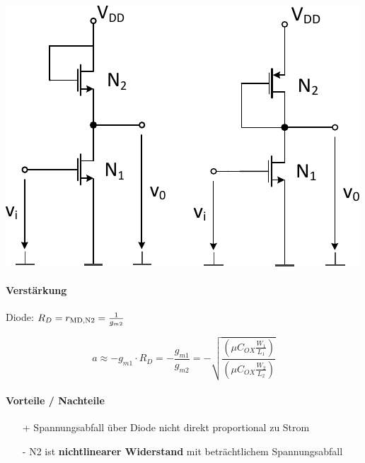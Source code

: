 \begin{minipage}[t]{0.5\columnwidth}
    \includegraphics[width=\columnwidth, align=t]{images/07_verstaerker_mit_diodenlast.pdf}
\end{minipage}
\hfill
\begin{minipage}[t]{0.46\columnwidth}
    \paragraph{Verstärkung}

    Diode: $R_D = r_{\rm MD, N2} = \frac{1}{g_{m2}}$

    \vspace{-0.2cm}

    \[
        a \approx - g_{m1} \cdot R_D = - \frac{g_{m1}}{g_{m2}} = - \sqrt{\frac{\left( \mu C_{OX} \frac{W_1}{L_1} \right)}{\left( \mu C_{OX} \frac{W_2}{L_2} \right)}}
    \]

    \paragraph{Vorteile / Nachteile}

     \begin{itemize}
        \item[+] Spannungsabfall über Diode nicht direkt proportional zu Strom
        \item[-] N2 ist \textbf{nichtlinearer Widerstand} mit beträchtlichem Spannungsabfall
     \end{itemize}
\end{minipage}

\smallskip

